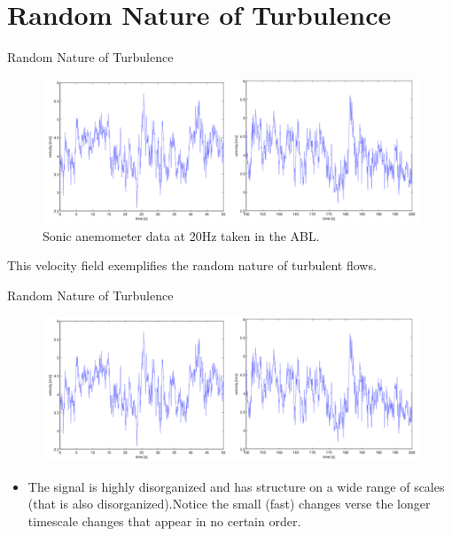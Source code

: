 \section{Random Nature of Turbulence} %
\begin{frame}{Random Nature of Turbulence}
  \begin{figure}[H]
  \centering
  \includegraphics[width=1\textwidth]{timetrace1.png}
  \caption{\scriptsize Sonic anemometer data at 20Hz taken in the ABL.}
  \end{figure}
  
  This velocity field exemplifies the random nature of turbulent flows.
\end{frame}


\begin{frame}{Random Nature of Turbulence}
  \begin{figure}[H]
  \centering
  \includegraphics[width=1\textwidth]{timetrace1.png}
  \end{figure}
  \begin{itemize}
  \item The signal is highly disorganized and has structure on a wide range of scales (that is also disorganized).\newline\newline Notice the small (fast) changes verse the longer timescale changes that appear in no certain order.
  \end{itemize}
\end{frame}

